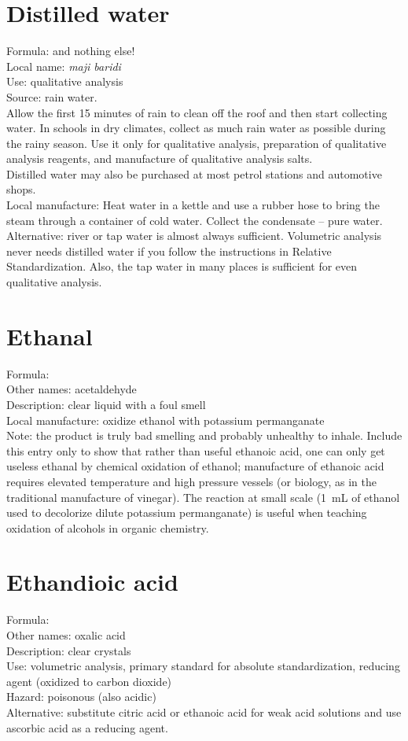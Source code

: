 \section{Distilled water}
\label{sec:}
Formula:  and nothing else!\\
Local name: \textit{maji baridi}\\
Use: qualitative analysis\\
Source: rain water.\\
Allow the first 15 minutes of rain to clean off the roof 
and then start collecting water. 
In schools in dry climates, 
collect as much rain water as possible during the rainy season. 
Use it only for qualitative analysis, 
preparation of qualitative analysis reagents, 
and manufacture of qualitative analysis salts.\\ 
Distilled water may also be purchased at most petrol stations 
and automotive shops.\\
Local manufacture: Heat water in a kettle 
and use a rubber hose to bring the steam through a container of cold water. 
Collect the condensate -- pure water.\\
Alternative: river or tap water is almost always sufficient. 
Volumetric analysis never needs distilled water 
if you follow the instructions in Relative Standardization. 
Also, 
the tap water in many places is sufficient for even qualitative analysis.

\section{Ethanal}
\label{sec:ethanal}
Formula: \\
Other names: acetaldehyde\\
Description: clear liquid with a foul smell\\
Local manufacture: oxidize ethanol with potassium permanganate\\
Note: the product is truly bad smelling and probably unhealthy to inhale. 
Include this entry only to show that rather than useful ethanoic acid, 
one can only get useless ethanal by chemical oxidation of ethanol; 
manufacture of ethanoic acid requires elevated temperature 
and high pressure vessels (or biology, 
as in the traditional manufacture of vinegar). 
The reaction at small scale 
(1~mL of ethanol used to decolorize dilute potassium permanganate) 
is useful when teaching oxidation of alcohols in organic chemistry.

\section{Ethandioic acid}
\label{sec:}
Formula: \\
Other names: oxalic acid\\
Description: clear crystals\\
Use: volumetric analysis, 
primary standard for absolute standardization, 
reducing agent (oxidized to carbon dioxide)\\
Hazard: poisonous (also acidic)\\
Alternative: substitute citric acid or ethanoic acid 
for weak acid solutions and use ascorbic acid as a reducing agent.

